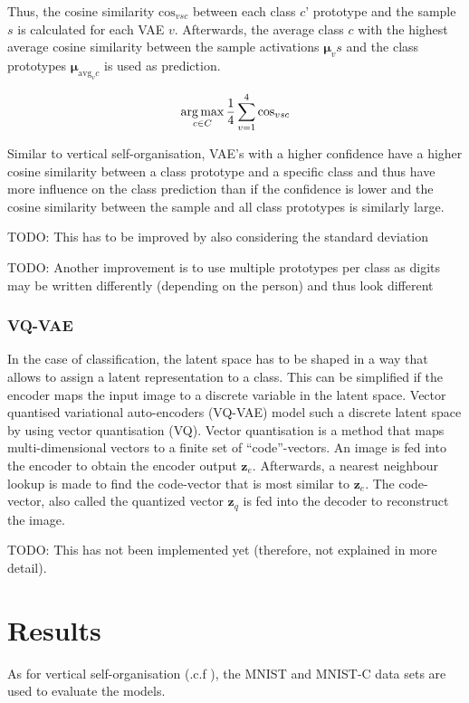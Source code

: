 Thus, the cosine similarity $\text{cos}_{vsc}$ between each class $c$' prototype and the sample $s$ is calculated for each VAE $v$.
Afterwards, the average class $c$ with the highest average cosine similarity between the sample activations $\boldsymbol{\mu}_vs$ and the class prototypes $\boldsymbol{\mu}_{\text{avg}_vc}$ is used as prediction.

\begin{equation}\eqlbl{hso_14}
		\argmax_{c \in C} \frac{1}{4} \sum_{v=1}^{4} \text{cos}_{vsc}
\end{equation}

Similar to vertical self-organisation, VAE's with a higher confidence have a higher cosine similarity between a class prototype and a specific class and thus have more influence on the class prediction than if the confidence is lower and the cosine similarity between the sample and all class prototypes is similarly large.

TODO: This has to be improved by also considering the standard deviation


TODO: Another improvement is to use multiple prototypes per class as digits may be written differently (depending on the person) and thus look different


\subsubsection{VQ-VAE}
In the case of classification, the latent space has to be shaped in a way that allows to assign a latent representation to a class.
This can be simplified if the encoder maps the input image to a discrete variable in the latent space.
Vector quantised variational auto-encoders (VQ-VAE)  model such a discrete latent space by using vector quantisation (VQ).
Vector quantisation is a method that maps multi-dimensional vectors to a finite set of ``code''-vectors.
An image is fed into the encoder to obtain the encoder output $\boldsymbol{z}_e$.
Afterwards, a nearest neighbour lookup is made to find the code-vector that is most similar to $\boldsymbol{z}_e$.
The code-vector, also called the quantized vector $\boldsymbol{z}_q$ is fed into the decoder to reconstruct the image.


TODO: This has not been implemented yet (therefore, not explained in more detail).



\section{Results}
As for vertical self-organisation (.c.f ), the MNIST \cite{Lecun_Bottou_Bengio_Haffner_1998} and MNIST-C  data sets are used to evaluate the models. 

